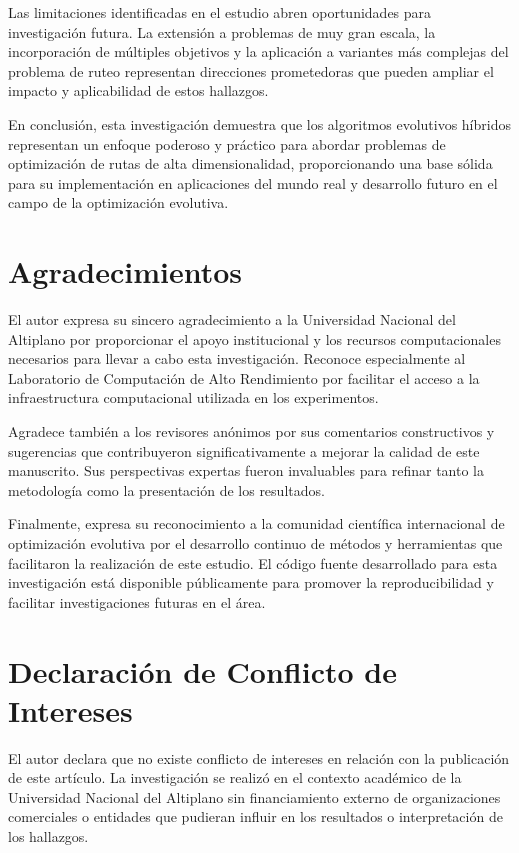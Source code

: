 \documentclass[12pt,a4paper]{article}
\begin{document}
Las limitaciones identificadas en el estudio abren oportunidades para investigación futura. La extensión a problemas de muy gran escala, la incorporación de múltiples objetivos y la aplicación a variantes más complejas del problema de ruteo representan direcciones prometedoras que pueden ampliar el impacto y aplicabilidad de estos hallazgos.

En conclusión, esta investigación demuestra que los algoritmos evolutivos híbridos representan un enfoque poderoso y práctico para abordar problemas de optimización de rutas de alta dimensionalidad, proporcionando una base sólida para su implementación en aplicaciones del mundo real y desarrollo futuro en el campo de la optimización evolutiva.

\section{Agradecimientos}

El autor expresa su sincero agradecimiento a la Universidad Nacional del Altiplano por proporcionar el apoyo institucional y los recursos computacionales necesarios para llevar a cabo esta investigación. Reconoce especialmente al Laboratorio de Computación de Alto Rendimiento por facilitar el acceso a la infraestructura computacional utilizada en los experimentos.

Agradece también a los revisores anónimos por sus comentarios constructivos y sugerencias que contribuyeron significativamente a mejorar la calidad de este manuscrito. Sus perspectivas expertas fueron invaluables para refinar tanto la metodología como la presentación de los resultados.

Finalmente, expresa su reconocimiento a la comunidad científica internacional de optimización evolutiva por el desarrollo continuo de métodos y herramientas que facilitaron la realización de este estudio. El código fuente desarrollado para esta investigación está disponible públicamente para promover la reproducibilidad y facilitar investigaciones futuras en el área.

\section{Declaración de Conflicto de Intereses}

El autor declara que no existe conflicto de intereses en relación con la publicación de este artículo. La investigación se realizó en el contexto académico de la Universidad Nacional del Altiplano sin financiamiento externo de organizaciones comerciales o entidades que pudieran influir en los resultados o interpretación de los hallazgos.
\end{document}
